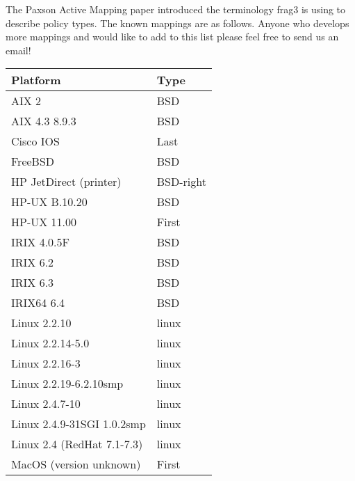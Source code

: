\documentclass[english]{report}
\begin{document}
\begin{itemize}
\begin{itemize}
The Paxson Active Mapping paper introduced the terminology frag3 is using to
describe policy types.  The known mappings are as follows.  Anyone who develops
more mappings and would like to add to this list please feel free to send us an
email!

\begin{tabular}{| l | l |}
\hline
\textbf{Platform} & \textbf{Type}\\
\hline
\hline                     
                        AIX 2  & BSD \\
                        \hline
                AIX 4.3 8.9.3  & BSD \\
                        \hline
                    Cisco IOS  & Last \\
                        \hline
                      FreeBSD  & BSD\\
                        \hline 
       HP JetDirect (printer)  & BSD-right \\
                        \hline
                HP-UX B.10.20  & BSD \\
                        \hline
                  HP-UX 11.00  & First \\
                        \hline
                  IRIX 4.0.5F  & BSD \\
                        \hline
                     IRIX 6.2  & BSD \\
                        \hline
                     IRIX 6.3  & BSD \\
                        \hline
                   IRIX64 6.4  & BSD \\
                        \hline
                 Linux 2.2.10  & linux \\
                        \hline
             Linux 2.2.14-5.0  & linux \\
                        \hline
               Linux 2.2.16-3  & linux \\
                        \hline
       Linux 2.2.19-6.2.10smp  & linux \\
                        \hline
               Linux 2.4.7-10  & linux \\
                        \hline
   Linux 2.4.9-31SGI 1.0.2smp  & linux \\
                        \hline
   Linux 2.4 (RedHat 7.1-7.3)  & linux \\
                        \hline
      MacOS (version unknown)  & First \\
                        \hline

\end{tabular}
\end{itemize}
\end{itemize}
\end{document}
